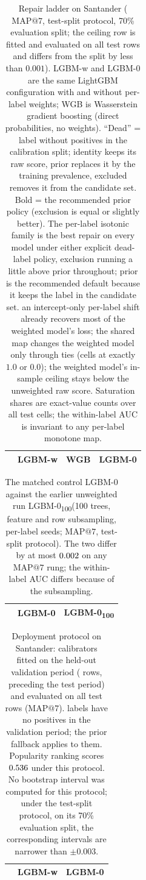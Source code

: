 \documentclass[sigconf,nonacm]{acmart}
\makeatletter
\newcommand{\Sm}{\textsf{LGBM-w}\xspace}
\newcommand{\Wm}{\textsf{WGB}\xspace}
\newcommand{\Nm}{\textsf{LGBM-0}\xspace}
\newcommand{\Nhm}{\textsf{LGBM-0\textsubscript{100}}\xspace}
\newcommand{\mapseven}{\mathrm{MAP}@7\xspace}
\makeatother
\begin{document}
\begin{table}[H]
\caption{Repair ladder on Santander ($\mapseven$, test-split protocol, 70\% evaluation split; the ceiling row is fitted and evaluated on all test rows and differs from the split by less than $0.001$). \Sm and \Nm are the same LightGBM configuration with and without per-label weights; \Wm is Wasserstein gradient boosting (direct probabilities, no weights). ``Dead'' = label without positives in the calibration split; identity keeps its raw score, prior replaces it by the training prevalence, excluded removes it from the candidate set. Bold = the recommended prior policy (exclusion is equal or slightly better). The per-label isotonic family is the best repair on every model under either explicit dead-label policy, exclusion running a little above prior throughout; prior is the recommended default because it keeps the label in the candidate set. an intercept-only per-label shift already recovers most of the weighted model's loss; the shared map changes the weighted model only through ties (cells at exactly $1.0$ or $0.0$); the weighted model's in-sample ceiling stays below the unweighted raw score. Saturation shares are exact-value counts over all test cells; the within-label AUC is invariant to any per-label monotone map.}
\label{tab:ladder}
\footnotesize
\setlength{\tabcolsep}{4pt}
\begin{tabular}{@{}lccc@{}}
\toprule
 & \Sm & \Wm & \Nm \\
\midrule

\bottomrule
\end{tabular}
\end{table}
\begin{table}[H]
\caption{The matched control \Nm against the earlier unweighted run \Nhm (100 trees, feature and row subsampling, per-label seeds; $\mapseven$, test-split protocol). The two differ by at most $0.002$ on any $\mapseven$ rung; the within-label AUC differs because of the subsampling.}
\label{tab:earlier}
\footnotesize
\setlength{\tabcolsep}{4pt}
\begin{tabular}{@{}lcc@{}}
\toprule
 & \Nm & \Nhm \\
\midrule

\bottomrule
\end{tabular}
\end{table}
\begin{table}[H]
\caption{Deployment protocol on Santander: calibrators fitted on the held-out validation period (\nnValRows{} rows, preceding the test period) and evaluated on all \nnTest{} test rows ($\mapseven$). \ndepSnDeadVal{} labels have no positives in the validation period; the prior fallback applies to them. Popularity ranking scores $0.536$ under this protocol. No bootstrap interval was computed for this protocol; under the test-split protocol, on its 70\% evaluation split, the corresponding intervals are narrower than $\pm0.003$.}
\label{tab:deploy}
\footnotesize
\setlength{\tabcolsep}{4pt}
\begin{tabular}{@{}lcc@{}}
\toprule
 & \Sm & \Nm \\
\midrule

\bottomrule
\end{tabular}
\end{table}
\end{document}
